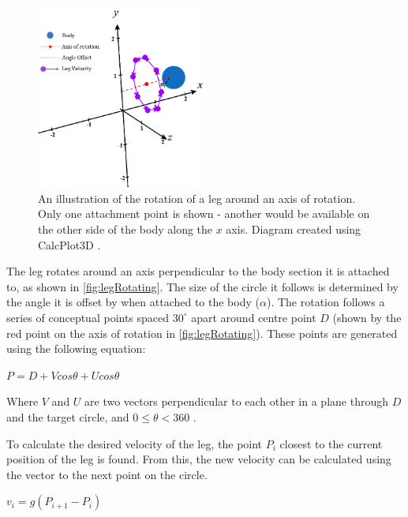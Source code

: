 \documentclass{article}
\begin{document}
\begin{figure}[H]
\centering
\includegraphics[width=0.5\textwidth]{legCircleDiagram}
\caption{An illustration of the rotation of a leg around an axis of rotation. Only one attachment point is shown - another would be available on the other side of the body along the $x$ axis. Diagram created using CalcPlot3D \citep{diagrams}.\\}
\label{fig:legRotating}
\end{figure}

The leg rotates around an axis perpendicular to the body section it is attached to, as shown in \autoref{fig:legRotating}. The size of the circle it follows is determined by the angle it is offset by when attached to the body ($\alpha$). The rotation follows a series of conceptual points spaced $30^\circ$ apart around centre point $D$ (shown by the red point on the axis of rotation in \autoref{fig:legRotating}). These points are generated using the following equation:
\begin{center}
\begin{Large}
$P = D + Vcos\theta + Ucos\theta$\\
\end{Large}
\end{center}

\noindent Where $V$ and $U$ are two vectors perpendicular to each other in a plane through $D$ and the target circle, and $0\leq\theta<360$ .
 
\noindent To calculate the desired velocity of the leg, the point $P_i$ closest to the current position of the leg is found. From this, the new velocity can be calculated using the vector to the next point on the circle.   
\begin{center}
\begin{Large}
$v_{i} = g(P_{i + 1} - P_{i})$
\end{Large}
\end{center}
\end{document}
